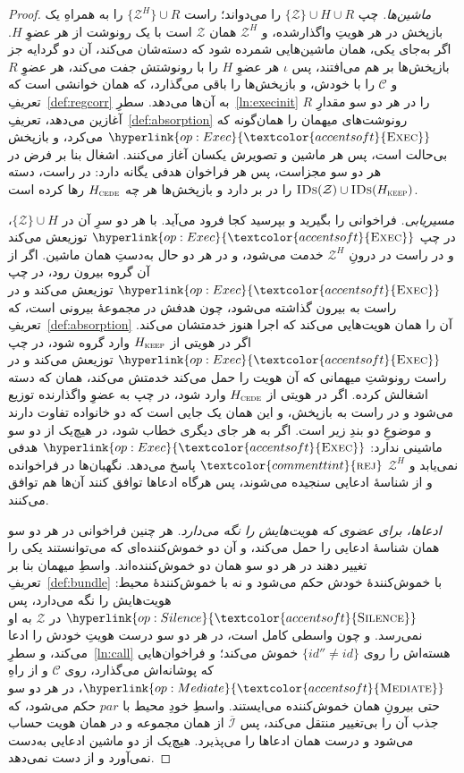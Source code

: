 \documentclass[10pt,oneside,openany]{book}
\newcommand{\pars}{\mathit{par}}
\newcommand{\Corr}{\mathcal{C}}
\newcommand{\Zenv}{\mathcal{Z}}
\newcommand{\op}[1]{\textnormal{\textsc{#1}}}
\newcommand{\opl}[1]{\hyperlink{op:#1}{\textcolor{accentsoft}{\op{#1}}}}
\newcommand{\IDs}{\op{IDs}}
\newcommand{\Ids}{\mathcal{I}}
\newcommand{\id}{id}
\newcommand{\atom}[1]{\textcolor{commenttint}{\op{#1}}}
\newcommand{\rej}{\atom{rej}}
\theoremstyle{accentdef}
\theoremstyle{accentplain}
\begin{document}
\begin{proof}
\emph{ماشین‌ها.} چپ $\{\Zenv\} \cup H \cup R$ را می‌دواند؛ راست
$\{\Zenv^{H}\} \cup R$ را به همراهِ یک بازپخش در هر هویتِ واگذارشده، و
$\Zenv^{H}$ همان $\Zenv$ است با یک رونوشت از هر عضوِ $H$. اگر به‌جای یکی،
همان ماشین‌هایی شمرده شود که دسته‌شان می‌کند، آن دو گردایه جز بازپخش‌ها بر
هم می‌افتند، پس $\iota$ هر عضوِ $H$ را با رونوشتش جفت می‌کند، هر عضوِ $R$
و $\Corr$ را با خودش، و بازپخش‌ها را باقی می‌گذارد، که همان خوانشی است که
تعریفِ~\ref{def:regcorr} به آن‌ها می‌دهد. سطرِ~\ref{ln:execinit} $R$ را در
هر دو سو مقدارِ آغازین می‌دهد، تعریفِ~\ref{def:absorption} رونوشت‌های
میهمان را همان‌گونه که $\opl{Exec}$ می‌کرد، و بازپخش بی‌حالت است، پس هر
ماشین و تصویرش یکسان آغاز می‌کنند. اشغال بنا بر فرض در هر دو سو مجزاست،
پس هر فراخوان هدفی یگانه دارد: در راست، دسته $\IDs(\Zenv) \cup
\IDs(H_{\op{keep}})$ را در بر دارد و بازپخش‌ها هر چه $H_{\op{cede}}$ رها
کرده است.

\emph{مسیریابی.} فراخوانی را بگیرید و بپرسید کجا فرود می‌آید. با هر دو سرِ
آن در $\{\Zenv\} \cup H$، در چپ $\opl{Exec}$ توزیعش می‌کند و در راست در
درونِ $\Zenv^{H}$ خدمت می‌شود، و در هر دو حال به‌دستِ همان ماشین. اگر از
آن گروه بیرون رود، در چپ $\opl{Exec}$ توزیعش می‌کند و در راست به بیرون
گذاشته می‌شود، چون هدفش در مجموعهٔ بیرونی است، که
تعریفِ~\ref{def:absorption} آن را همان هویت‌هایی می‌کند که اجرا هنوز
خدمتشان می‌کند. اگر در هویتی از $H_{\op{keep}}$ وارد گروه شود، در چپ
$\opl{Exec}$ توزیعش می‌کند و در راست رونوشتِ میهمانی که آن هویت را حمل
می‌کند خدمتش می‌کند، همان که دسته اشغالش کرده. اگر در هویتی از
$H_{\op{cede}}$ وارد شود، در چپ به عضوِ واگذارنده توزیع می‌شود و در راست
به بازپخش، و این همان یک جایی است که دو خانواده تفاوت دارند و موضوعِ دو
بندِ زیر است. اگر به هر جای دیگری خطاب شود، در هیچ‌یک از دو سو ماشینی
ندارد: $\opl{Exec}$ هدفی نمی‌یابد و $\Zenv^{H}$ $\rej$ پاسخ می‌دهد.
نگهبان‌ها در فراخوانده و از شناسهٔ ادعایی سنجیده می‌شوند، پس هرگاه ادعاها
توافق کنند آن‌ها هم توافق می‌کنند.

\emph{ادعاها، برای عضوی که هویت‌هایش را نگه می‌دارد.} هر چنین فراخوانی در
هر دو سو همان شناسهٔ ادعایی را حمل می‌کند، و آن دو خموش‌کننده‌ای که
می‌توانستند یکی را تغییر دهند در هر دو سو همان دو خموش‌کننده‌اند. واسطِ
میهمان بنا بر تعریفِ~\ref{def:bundle} با خموش‌کنندهٔ خودش حکم می‌شود و نه
با خموش‌کنندهٔ محیط: هویت‌هایش را نگه می‌دارد، پس $\opl{Silence}$ در
$\Zenv$ به او نمی‌رسد. و چون واسطی کامل است، در هر دو سو درست هویتِ خودش
را ادعا می‌کند، و سطرِ~\ref{ln:call} هسته‌اش را روی $\{\id'' \neq \id\}$
خموش می‌کند؛ و فراخوان‌هایی که پوشانه‌اش می‌گذارد، روی $\Corr$ و از راهِ
$\opl{Mediate}$، در هر دو سو حتی بیرونِ همان خموش‌کننده می‌ایستند. واسطِ
خودِ محیط با $\pars$ حکم می‌شود، که جذب آن را بی‌تغییر منتقل می‌کند، پس
$\overline{\Ids}$ از همان مجموعه و در همان هویت حساب می‌شود و درست همان
ادعاها را می‌پذیرد. هیچ‌یک از دو ماشین ادعایی به‌دست نمی‌آورد و از دست
نمی‌دهد.


\end{proof}
\end{document}
